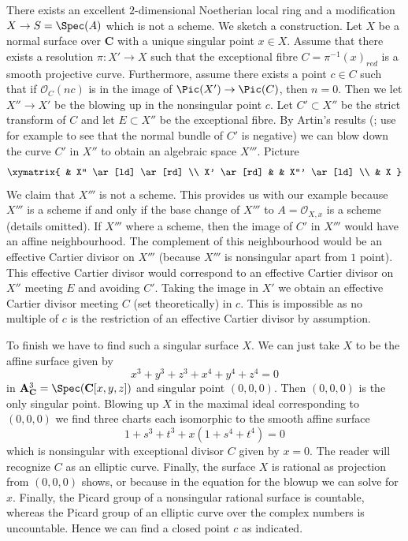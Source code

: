 \begin{example}
\label{example-not-blow-up}
There exists an excellent $2$-dimensional Noetherian local ring
and a modification $X \to S = \Spec(A)$ which is not a scheme.
We sketch a construction. Let $X$ be a normal surface over $\mathbf{C}$
with a unique singular point $x \in X$. Assume that there exists a
resolution $\pi : X' \to X$ such that the exceptional fibre
$C = \pi^{-1}(x)_{red}$ is a smooth projective curve. Furthermore, assume
there exists a point $c \in C$ such that if $\mathcal{O}_C(nc)$
is in the image of $\Pic(X') \to \Pic(C)$, then $n = 0$.
Then we let $X'' \to X'$ be the blowing up in the nonsingular point $c$.
Let $C' \subset X''$ be the strict transform of $C$ and let $E \subset X''$
be the exceptional fibre. By Artin's results
(\cite{ArtinII}; use for example \cite{Mumford-topology}
to see that the normal bundle of $C'$ is negative)
we can blow down the curve $C'$ in $X''$ to obtain an algebraic space $X'''$.
Picture
$$
\xymatrix{
& X'' \ar[ld] \ar[rd] \\
X' \ar[rd] &  & X''' \ar[ld] \\
& X
}
$$
We claim that $X'''$ is not a scheme. This provides us with our example
because $X'''$ is a scheme if and only if the base change of $X'''$
to $A = \mathcal{O}_{X, x}$ is a scheme (details omitted).
If $X'''$ where a scheme, then the image of $C'$ in $X'''$ would
have an affine neighbourhood. The complement of this neighbourhood
would be an effective Cartier divisor on $X'''$ (because $X'''$ is
nonsingular apart from $1$ point). This effective Cartier divisor would
correspond to an effective Cartier divisor on $X''$
meeting $E$ and avoiding $C'$. Taking the image in $X'$ we obtain
an effective Cartier divisor meeting $C$ (set theoretically) in $c$.
This is impossible as no multiple of $c$ is the restriction of an
effective Cartier divisor by assumption.

\medskip\noindent
To finish we have to find such a singular surface $X$. We can just take
$X$ to be the affine surface given by
$$
x^3 + y^3 + z^3 + x^4 + y^4 + z^4 = 0
$$
in $\mathbf{A}^3_\mathbf{C} = \Spec(\mathbf{C}[x, y, z])$ and singular point
$(0, 0, 0)$. Then $(0, 0, 0)$ is the only singular point. Blowing up $X$
in the maximal ideal corresponding to $(0, 0, 0)$ we find three charts each
isomorphic to the smooth affine surface
$$
1 + s^3 + t^3 + x(1 + s^4 + t^4) = 0
$$
which is nonsingular with exceptional divisor $C$ given by $x = 0$. The reader
will recognize $C$ as an elliptic curve. Finally, the surface $X$ is rational
as projection from $(0, 0, 0)$ shows, or because in the equation for the
blowup we can solve for $x$. Finally, the Picard group of a nonsingular
rational surface is countable, whereas the Picard group of an elliptic
curve over the complex numbers is uncountable. Hence we can find a closed
point $c$ as indicated.
\end{example}














